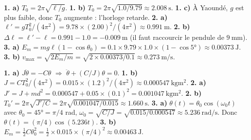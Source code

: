 \textbf{1. a)} $T_0 = 2\pi\sqrt{\ell/g}$.
\textbf{1. b)} $T_0 = 2\pi\sqrt{1.0/9.79} \approx \SI{2.008}{\second}$.
\textbf{1. c)} À Yaoundé, $g$ est plus faible, donc $T_0$ augmente : l'horloge retarde.
\textbf{2. a)} $\ell' = g T_0^2/(4\pi^2) = 9.78 \times (2.00)^2/(4\pi^2) \approx \SI{0.991}{\metre}$.
\textbf{2. b)} $\Delta\ell = \ell' - \ell = 0.991 - 1.0 = \SI{-0.009}{\metre}$ (il faut raccourcir le pendule de $\SI{9}{\milli\metre}$).
\textbf{3. a)} $E_m = mg\ell(1-\cos\theta_0) = 0.1 \times 9.79 \times 1.0 \times (1-\cos\ang{5}) \approx \SI{0.00373}{\joule}$.
\textbf{3. b)} $v_{\max} = \sqrt{2E_m/m} = \sqrt{2 \times 0.00373/0.1} \approx \SI{0.273}{\metre\per\second}$.

\textbf{1. a)} $J\ddot{\theta} = -C\theta$ $\Rightarrow$ $\ddot{\theta} + (C/J)\theta = 0$.
\textbf{1. b)} $J = C T_0^2/(4\pi^2) = 0.015 \times (1.2)^2/(4\pi^2) \approx \SI{0.000547}{\kilogram\metre\squared}$.
\textbf{2. a)} $J' = J + m d^2 = 0.000547 + 0.05 \times (0.1)^2 = \SI{0.001047}{\kilogram\metre\squared}$.
\textbf{2. b)} $T_0' = 2\pi\sqrt{J'/C} = 2\pi\sqrt{0.001047/0.015} \approx \SI{1.660}{\second}$.
\textbf{3. a)} $\theta(t) = \theta_0\cos(\omega_0 t)$ avec $\theta_0 = \ang{45} = \pi/4$ rad, $\omega_0 = \sqrt{C/J} = \sqrt{0.015/0.000547} \approx \SI{5.236}{\radian\per\second}$. Donc $\theta(t) = (\pi/4)\cos(5.236 t)$.
\textbf{3. b)} $E_m = \frac{1}{2}C\theta_0^2 = \frac{1}{2} \times 0.015 \times (\pi/4)^2 \approx \SI{0.00463}{\joule}$.